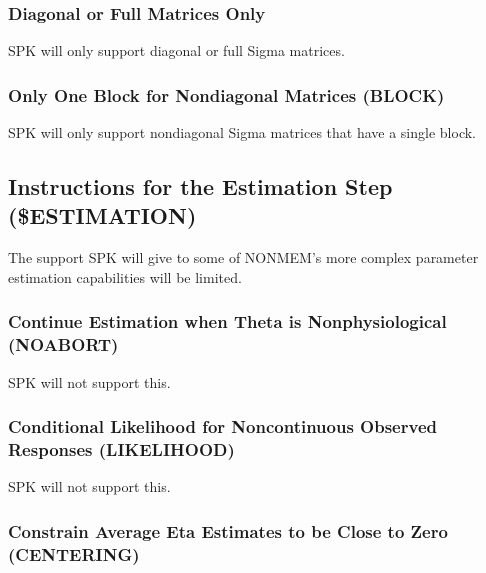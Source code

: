 \documentclass{article}
\begin{document}
\subsubsection{Diagonal or Full Matrices Only}

SPK will only support diagonal or full Sigma matrices.


\subsubsection{Only One Block for Nondiagonal Matrices (BLOCK)}

SPK will only support nondiagonal Sigma matrices that 
have a single block.


\subsection{Instructions for the Estimation Step (\$ESTIMATION)}

The support SPK will give to some of NONMEM's more complex parameter
estimation capabilities will be limited.


\subsubsection{Continue Estimation when Theta is Nonphysiological (NOABORT)}

SPK will not support this.


\subsubsection{Conditional Likelihood for Noncontinuous Observed
  Responses (LIKELIHOOD)}

SPK will not support this.


\subsubsection{Constrain Average Eta Estimates to be Close to Zero (CENTERING)}
\end{document}
